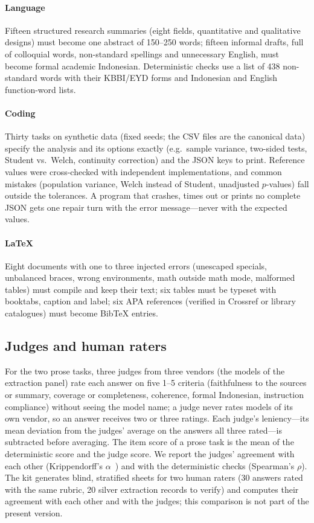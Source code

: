 \paragraph{Language} Fifteen structured research summaries (eight fields, quantitative and qualitative designs) must become one abstract of 150--250 words; fifteen informal drafts, full of colloquial words, non-standard spellings and unnecessary English, must become formal academic Indonesian. Deterministic checks use a list of 438 non-standard words with their KBBI/EYD forms and Indonesian and English function-word lists.

\paragraph{Coding} Thirty tasks on synthetic data (fixed seeds; the CSV files are the canonical data) specify the analysis and its options exactly (e.g.\ sample variance, two-sided tests, Student vs.\ Welch, continuity correction) and the JSON keys to print. Reference values were cross-checked with independent implementations, and common mistakes (population variance, Welch instead of Student, unadjusted $p$-values) fall outside the tolerances. A program that crashes, times out or prints no complete JSON gets one repair turn with the error message---never with the expected values.

\paragraph{LaTeX} Eight documents with one to three injected errors (unescaped specials, unbalanced braces, wrong environments, math outside math mode, malformed tables) must compile and keep their text; six tables must be typeset with booktabs, caption and label; six APA references (verified in Crossref or library catalogues) must become BibTeX entries.

\subsection{Judges and human raters}
For the two prose tasks, three judges from three vendors (the models of the extraction panel) rate each answer on five 1--5 criteria (faithfulness to the sources or summary, coverage or completeness, coherence, formal Indonesian, instruction compliance) without seeing the model name; a judge never rates models of its own vendor, so an answer receives two or three ratings. Each judge's leniency---its mean deviation from the judges' average on the answers all three rated---is subtracted before averaging. The item score of a prose task is the mean of the deterministic score and the judge score. We report the judges' agreement with each other (Krippendorff's $\alpha$~\cite{hayes2007alpha}) and with the deterministic checks (Spearman's $\rho$). The kit generates blind, stratified sheets for two human raters (30 answers rated with the same rubric, 20 silver extraction records to verify) and computes their agreement with each other and with the judges; this comparison is not part of the present version.

